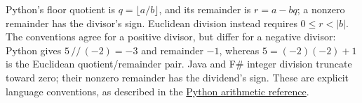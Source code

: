         Python's floor quotient is $q=\lfloor a/b\rfloor$, and its remainder is $r=a-bq$; a nonzero remainder has the divisor's sign.
        Euclidean division instead requires $0\leq r<|b|$.
        The conventions agree for a positive divisor, but differ for a negative divisor: Python gives $5\,\mathtt{//}\,(-2)=-3$ and remainder $-1$, whereas $5=(-2)(-2)+1$ is the Euclidean quotient/remainder pair.
        Java and F\# integer division truncate toward zero; their nonzero remainder has the dividend's sign.
        These are explicit language conventions, as described in the \href{https://docs.python.org/3/reference/expressions.html\#binary-arithmetic-operations}{Python arithmetic reference}.
